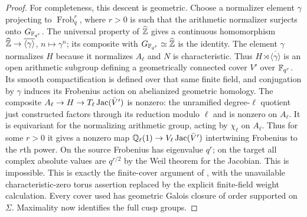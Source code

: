 \begin{proof}
For completeness, this descent is geometric. Choose a normalizer element
$\gamma$ projecting to $\operatorname{Frob}_q^r$, where $r>0$ is such that
the arithmetic normalizer surjects onto $G_{\mathbb F_{q^r}}$. The universal
property of $\widehat{\mathbb Z}$ gives a continuous homomorphism
$\widehat{\mathbb Z}\to\overline{\langle\gamma\rangle}$, $n\mapsto\gamma^n$;
its composite with $G_{\mathbb F_{q^r}}\simeq\widehat{\mathbb Z}$ is the identity.
The element $\gamma$ normalizes $H$ because it normalizes $A_\ell$ and
$N$ is characteristic. Thus $H\rtimes\overline{\langle\gamma\rangle}$
is an open arithmetic subgroup defining a geometrically connected cover
$V'$ over $\mathbb F_{q^r}$. Its smooth compactification is defined over that
same finite field, and conjugation by $\gamma$ induces its Frobenius action
on abelianized geometric homology. The composite
$A_\ell\to H\to T_\ell\operatorname{Jac}(\bar V')$ is nonzero: the unramified
degree-$\ell$ quotient just constructed factors through its reduction
modulo $\ell$ and is nonzero on $A_\ell$. It is equivariant for the
normalizing arithmetic group, acting by $\chi_\ell$ on $A_\ell$.
Thus for some $r>0$ it gives a nonzero map
$\mathbb Q_\ell(1)\to V_\ell\operatorname{Jac}(\bar V')$ intertwining Frobenius to the
$r$th power. On the source Frobenius has eigenvalue $q^r$; on the target
all complex absolute values are $q^{r/2}$ by the Weil theorem for the
Jacobian. This is impossible. This is exactly the finite-cover argument
of \citet[Theorem 20, proof]{CF_Stix2008}, with the unavailable characteristic-zero
torus assertion replaced by the explicit finite-field weight calculation.
Every cover used has geometric Galois closure of order supported on
$\Sigma$. Maximality now identifies the full cusp groups.
\end{proof}

